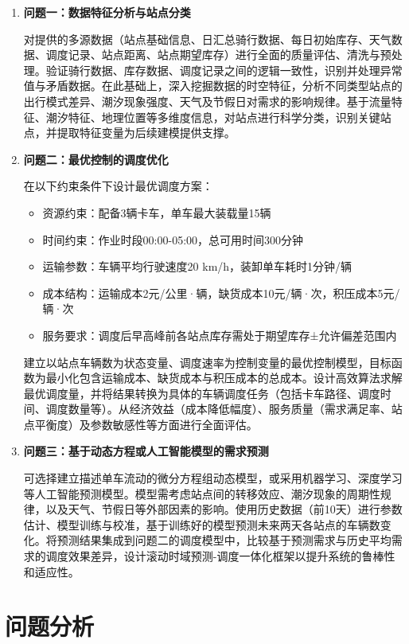 \documentclass[12pt,a4paper]{ctexart}
\begin{document}
\begin{enumerate}
    \item \textbf{问题一：数据特征分析与站点分类}

    对提供的多源数据（站点基础信息、日汇总骑行数据、每日初始库存、天气数据、调度记录、站点距离、站点期望库存）进行全面的质量评估、清洗与预处理。验证骑行数据、库存数据、调度记录之间的逻辑一致性，识别并处理异常值与矛盾数据。在此基础上，深入挖掘数据的时空特征，分析不同类型站点的出行模式差异、潮汐现象强度、天气及节假日对需求的影响规律。基于流量特征、潮汐特征、地理位置等多维度信息，对站点进行科学分类，识别关键站点，并提取特征变量为后续建模提供支撑。

    \item \textbf{问题二：最优控制的调度优化}

    在以下约束条件下设计最优调度方案：
    \begin{itemize}
        \item 资源约束：配备3辆卡车，单车最大装载量15辆
        \item 时间约束：作业时段00:00-05:00，总可用时间300分钟
        \item 运输参数：车辆平均行驶速度20 km/h，装卸单车耗时1分钟/辆
        \item 成本结构：运输成本2元/公里·辆，缺货成本10元/辆·次，积压成本5元/辆·次
        \item 服务要求：调度后早高峰前各站点库存需处于期望库存±允许偏差范围内
    \end{itemize}

    建立以站点车辆数为状态变量、调度速率为控制变量的最优控制模型，目标函数为最小化包含运输成本、缺货成本与积压成本的总成本。设计高效算法求解最优调度量，并将结果转换为具体的车辆调度任务（包括卡车路径、调度时间、调度数量等）。从经济效益（成本降低幅度）、服务质量（需求满足率、站点平衡度）及参数敏感性等方面进行全面评估。

    \item \textbf{问题三：基于动态方程或人工智能模型的需求预测}

    可选择建立描述单车流动的微分方程组动态模型，或采用机器学习、深度学习等人工智能预测模型。模型需考虑站点间的转移效应、潮汐现象的周期性规律，以及天气、节假日等外部因素的影响。使用历史数据（前10天）进行参数估计、模型训练与校准，基于训练好的模型预测未来两天各站点的车辆数变化。将预测结果集成到问题二的调度模型中，比较基于预测需求与历史平均需求的调度效果差异，设计滚动时域预测-调度一体化框架以提升系统的鲁棒性和适应性。
\end{enumerate}

\section{问题分析}
\end{document}
